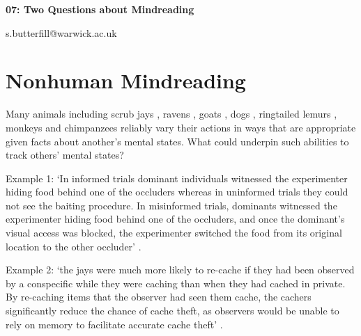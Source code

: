 \documentclass[12pt]{extarticle}
\date{}
\makeatletter
\def \ititle {Philosophical Psychology}
\def \iemail{s.butterfill@warwick.ac.uk}
\makeatother
\begin{document}
\begin{multicols*}{3}

\setlength\footnotesep{1em}









\def \ititle {07: Two Questions about Mindreading}

\begin{center}

{\Large

\textbf{\ititle}

}



\iemail %

\end{center}



\section{Nonhuman Mindreading}


Many animals including scrub jays \citep{Clayton:2007fh},
ravens \citep{bugnyar:2016_ravens},
goats \citep{kaminski:2006_goats},
dogs \citep{kaminski:2009_domestic},
ringtailed lemurs \citep{sandel:2011_evidence},
monkeys \citep{burkart:2007_understanding, hattori:2009_tufted}
and chimpanzees \citep{melis:2006_chimpanzees,karg:2015_chimpanzees,krupenye:2016_great} reliably vary their actions in ways that are appropriate given facts about another’s mental states.
What could underpin such abilities to track others’ mental states?

Example 1: ‘In informed trials dominant individuals witnessed the experimenter hiding
food behind one of the occluders whereas in uninformed trials they could
not see the baiting procedure. In misinformed trials, dominants witnessed
the experimenter hiding food behind one of the occluders, and once the
dominant’s visual access was blocked, the experimenter switched the food
from its original location to the other occluder’ \citep{Hare:2001ph}.

Example 2: ‘the jays were much more likely to re-cache if they had been observed by a conspecific while they
were caching than when they had cached in private. By re-caching items that the observer had seen
them cache, the cachers significantly reduce the chance of cache theft, as observers would be unable
to rely on memory to facilitate accurate cache theft’ \citep[p.~516]{Clayton:2007fh}.


\end{multicols*}
\end{document}
